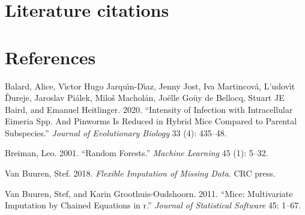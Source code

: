 \documentclass[
]{article}
\newlength{\cslhangindent}
\newlength{\cslentryspacingunit} %
\newenvironment{CSLReferences}[2] %
 {%
  \setlength{\parindent}{0pt}
  \ifodd #1
  \let\oldpar\par
  \def\par{\hangindent=\cslhangindent\oldpar}
  \fi
  \setlength{\parskip}{#2\cslentryspacingunit}
 }%
 {}
\begin{document}
\hypertarget{literature-citations}{%
\section{Literature citations}\label{literature-citations}}

\hypertarget{references}{%
\section*{References}\label{references}}

\hypertarget{refs}{}
\begin{CSLReferences}{1}{0}
\leavevmode{}%
Balard, Alice, Vı́ctor Hugo Jarquı́n-Dı́az, Jenny Jost, Iva Martincová,
L'udovı́t Ďureje, Jaroslav Piálek, Miloš Macholán, Joëlle Goüy de
Bellocq, Stuart JE Baird, and Emanuel Heitlinger. 2020. {``Intensity of
Infection with Intracellular Eimeria Spp. And Pinworms Is Reduced in
Hybrid Mice Compared to Parental Subspecies.''} \emph{Journal of
Evolutionary Biology} 33 (4): 435--48.

\leavevmode{}%
Breiman, Leo. 2001. {``Random Forests.''} \emph{Machine Learning} 45
(1): 5--32.

\leavevmode{}%
Van Buuren, Stef. 2018. \emph{Flexible Imputation of Missing Data}. CRC
press.

\leavevmode{}%
Van Buuren, Stef, and Karin Groothuis-Oudshoorn. 2011. {``Mice:
Multivariate Imputation by Chained Equations in r.''} \emph{Journal of
Statistical Software} 45: 1--67.

\end{CSLReferences}
\end{document}
